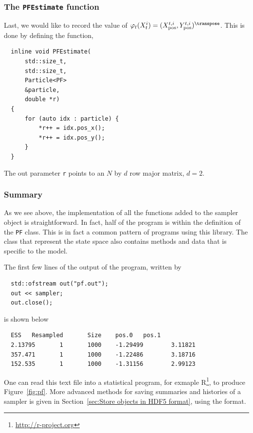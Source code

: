 \subsubsection{The \texttt{PFEstimate} function}

Last, we would like to record the value of $\varphi_t(X_t^i) =
(\xpos^{t,i},\ypos^{t,i})^{\transpose}$. This is done by defining the function,
\begin{Verbatim}
  inline void PFEstimate(
      std::size_t,
      std::size_t,
      Particle<PF>
      &particle,
      double *r)
  {
      for (auto idx : particle) {
          *r++ = idx.pos_x();
          *r++ = idx.pos_y();
      }
  }
\end{Verbatim}
The out parameter \verb|r| points to an $N$ by $d$ row major matrix, $d = 2$.

\subsubsection{Summary}

As we see above, the implementation of all the functions added to the sampler
object is straightforward. In fact, half of the program is within the
definition of the \verb|PF| class. This is in fact a common pattern of programs
using this library. The class that represent the state space also contains
methods and data that is specific to the model.

The first few lines of the output of the program, written by
\begin{Verbatim}
  std::ofstream out("pf.out");
  out << sampler;
  out.close();
\end{Verbatim}
is shown below
\begin{Verbatim}
  ESS   Resampled       Size    pos.0   pos.1
  2.13795       1       1000    -1.29499        3.11821
  357.471       1       1000    -1.22486        3.18716
  152.535       1       1000    -1.31156        2.99123
\end{Verbatim}
One can read this text file into a statistical program, for exmaple
R\footnote{\url{http://r-project.org}}, to produce Figure~\ref{fig:pf}. More
advanced methods for saving summaries and histories of a sampler is given in
Section~\ref{sec:Store objects in HDF5 format}, using the \hdf format.

